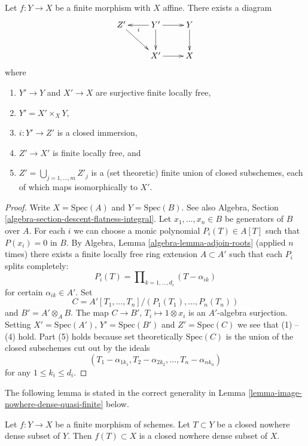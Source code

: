 \begin{lemma}
\label{lemma-massage-finite}
Let $f : Y \to X$ be a finite morphism with $X$ affine.
There exists a diagram
$$
\xymatrix{
Z' \ar[rd] &
Y' \ar[l]^i \ar[d] \ar[r] &
Y \ar[d] \\
 & X' \ar[r] & X
}
$$
where
\begin{enumerate}
\item $Y' \to Y$ and $X' \to X$ are surjective finite locally free,
\item $Y' = X' \times_X Y$,
\item $i : Y' \to Z'$ is a closed immersion,
\item $Z' \to X'$ is finite locally free, and
\item $Z' = \bigcup_{j = 1, \ldots, m} Z'_j$ is a (set theoretic)
finite union of closed subschemes, each of which maps isomorphically
to $X'$.
\end{enumerate}
\end{lemma}

\begin{proof}
Write $X = \text{Spec}(A)$ and $Y = \text{Spec}(B)$. See also
Algebra, Section \ref{algebra-section-descent-flatness-integral}.
Let $x_1, \ldots, x_n \in B$ be generators of $B$ over $A$.
For each $i$ we can choose a monic polynomial $P_i(T) \in A[T]$
such that $P(x_i) = 0$ in $B$. By
Algebra, Lemma \ref{algebra-lemma-adjoin-roots}
(applied $n$ times) there exists a finite locally free ring
extension $A \subset A'$ such that each $P_i$ splits completely:
$$
P_i(T) = \prod\nolimits_{k = 1, \ldots, d_i} (T - \alpha_{ik})
$$
for certain $\alpha_{ik} \in A'$. Set
$$
C = A'[T_1, \ldots, T_n]/(P_1(T_1), \ldots, P_n(T_n))
$$
and $B' = A' \otimes_A B$. The map $C \to B'$, $T_i \mapsto 1 \otimes x_i$
is an $A'$-algebra surjection. Setting $X' = \text{Spec}(A')$,
$Y' = \text{Spec}(B')$ and $Z' = \text{Spec}(C)$ we see that
(1) -- (4) hold. Part (5) holds because set theoretically
$\text{Spec}(C)$ is the union of the closed subschemes
cut out by the ideals
$$
(T_1 - \alpha_{1k_1}, T_2 - \alpha_{2k_2}, \ldots, T_n - \alpha_{nk_n})
$$
for any $1 \leq k_i \leq d_i$.
\end{proof}

\noindent
The following lemma is stated in the correct generality
in Lemma \ref{lemma-image-nowhere-dense-quasi-finite} below.

\begin{lemma}
\label{lemma-image-nowhere-dense-finite}
Let $f : Y \to X$ be a finite morphism of schemes.
Let $T \subset Y$ be a closed nowhere dense subset of $Y$.
Then $f(T) \subset X$ is a closed nowhere dense subset of $X$.
\end{lemma}

